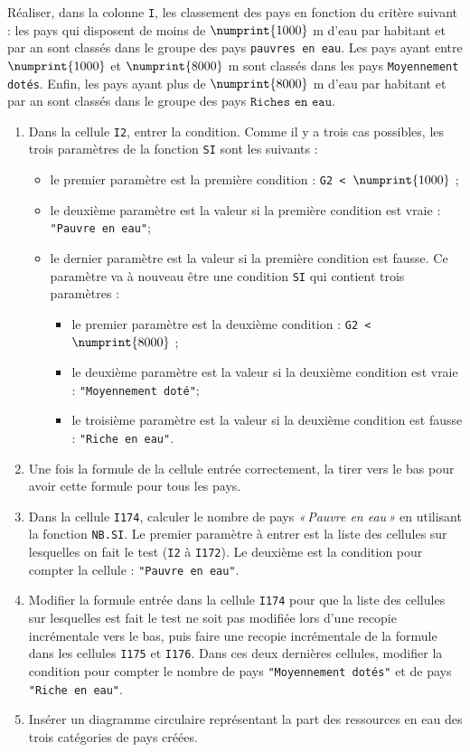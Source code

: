 Réaliser, dans la colonne \texttt{I}, les classement des pays en fonction du critère suivant : les pays qui disposent de moins de $\numprint{1000}$ m d'eau par habitant et par an sont classés dans le groupe des pays \texttt{pauvres en eau}. Les pays ayant entre $\numprint{1000}$ et $\numprint{8000}$ m sont classés dans les pays \texttt{Moyennement dotés}. Enfin, les pays ayant plus de $\numprint{8000}$ m d'eau par habitant et par an sont classés dans le groupe des pays $\texttt{Riches en eau}$.
\begin{enumerate}
\item Dans la cellule \texttt{I2}, entrer la condition. Comme il y a trois cas possibles, les trois paramètres de la fonction \texttt{SI} sont les suivants : 
  \begin{itemize}
    \item le premier paramètre est la première condition : \texttt{G2 < $\numprint{1000}$} ;
    \item le deuxième paramètre est la valeur si la première condition est vraie : \texttt{"Pauvre en eau"};
    \item le dernier paramètre est la valeur si la première condition est fausse. Ce paramètre va à nouveau être une condition \texttt{SI} qui contient trois paramètres :
	\begin{itemize}
	  \item le premier paramètre est la deuxième condition : \texttt{G2 < $\numprint{8000}$} ;
	  \item le deuxième paramètre est la valeur si la deuxième condition est vraie : \texttt{"Moyennement doté"};
	  \item le troisième paramètre est la valeur si la deuxième condition est fausse : \texttt{"Riche en eau"}.
	\end{itemize}  
  \end{itemize}
\item Une fois la formule de la cellule entrée correctement, la tirer vers le bas pour avoir cette formule pour tous les pays.
\item Dans la cellule \texttt{I174}, calculer le nombre de pays \emph{«\,Pauvre en eau\,»} en utilisant la fonction \texttt{NB.SI}. Le premier paramètre à entrer est la liste des cellules sur lesquelles on fait le test (\texttt{I2} à \texttt{I172}). Le deuxième est la condition pour compter la cellule : \texttt{"Pauvre en eau"}.
\item Modifier la formule entrée dans la cellule \texttt{I174} pour que la liste des cellules sur lesquelles est fait le test ne soit pas modifiée lors d'une recopie incrémentale vers le bas, puis faire une recopie incrémentale de la formule dans les cellules \texttt{I175} et \texttt{I176}. Dans ces deux dernières cellules, modifier la condition pour compter le nombre de pays \texttt{"Moyennement dotés"} et de pays \texttt{"Riche en eau"}.
\item Insérer un diagramme circulaire représentant la part des ressources en eau des trois catégories de pays créées.
\end{enumerate}




